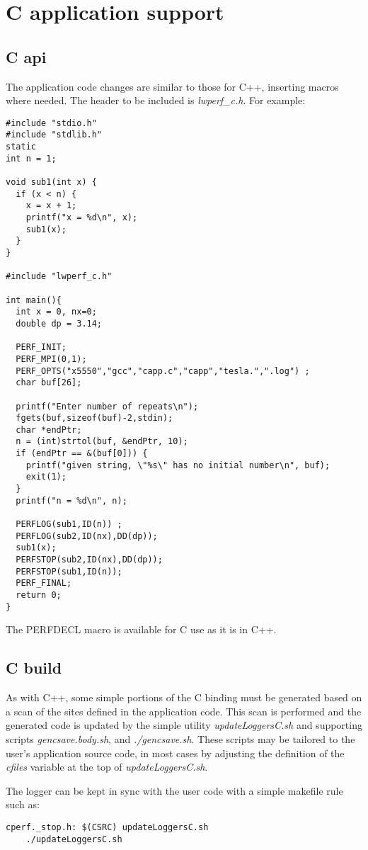 \documentclass{article}
\begin{document}
\section{C application support}
\label{sec:langC}

\subsection{C api}
\label{sec:capi}
The application code changes are similar to those for C++, inserting macros where needed. The header to be included is {\em lwperf\_c.h}. For example:
\begin{verbatim}
#include "stdio.h"
#include "stdlib.h"
static
int n = 1;

void sub1(int x) {
  if (x < n) {
    x = x + 1;
    printf("x = %d\n", x);
    sub1(x);
  }
}

#include "lwperf_c.h"

int main(){
  int x = 0, nx=0;
  double dp = 3.14;

  PERF_INIT;
  PERF_MPI(0,1);
  PERF_OPTS("x5550","gcc","capp.c","capp","tesla.",".log") ;
  char buf[26];

  printf("Enter number of repeats\n");
  fgets(buf,sizeof(buf)-2,stdin);
  char *endPtr;
  n = (int)strtol(buf, &endPtr, 10);
  if (endPtr == &(buf[0])) {
    printf("given string, \"%s\" has no initial number\n", buf);
    exit(1);
  }
  printf("n = %d\n", n);

  PERFLOG(sub1,ID(n)) ;
  PERFLOG(sub2,ID(nx),DD(dp));
  sub1(x);
  PERFSTOP(sub2,ID(nx),DD(dp));
  PERFSTOP(sub1,ID(n));
  PERF_FINAL;
  return 0;
}
\end{verbatim}

The PERFDECL macro is available for C use as it is in C++.

\subsection{C build}
\label{sec:cbuild}
As with C++, some simple portions of the C binding must be generated based on a scan of the sites defined in the application code. This scan is performed and the generated code is updated by the simple utility {\em updateLoggersC.sh} and supporting scripts {\em gencsave.body.sh}, and {\em ./gencsave.sh}. These scripts may be tailored to the user's application source code, in most cases by adjusting the definition of the {\em cfiles} variable at the top of {\em updateLoggersC.sh}.

The logger can be kept in sync with the user code with a simple makefile rule such as:
\begin{verbatim}
cperf._stop.h: $(CSRC) updateLoggersC.sh
	./updateLoggersC.sh
\end{verbatim}
\end{document}
